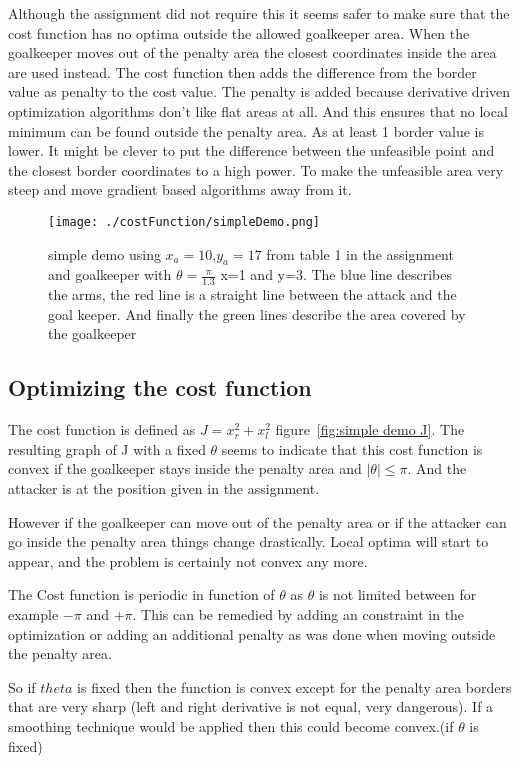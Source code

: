 Although the assignment did not require this it seems safer to make sure that the cost function has no optima outside the allowed goalkeeper area. When the goalkeeper moves out of the penalty area the closest coordinates inside the area are used instead. The cost function then adds the difference from the border value as penalty to the cost value. The penalty is added because derivative driven optimization algorithms don't like flat areas at all. And this ensures that no local minimum can be found outside the penalty area. As at least 1 border value is lower. It might be clever to put the difference between the unfeasible point and the closest border coordinates to a high power. To make the unfeasible area very steep and move gradient based algorithms away from it.


\begin{figure}[H]
	\centering
	\texttt{[image: ./costFunction/simpleDemo.png]}
	\caption{simple demo using $x_a = 10$,$y_a=17$ from table 1 in the assignment and goalkeeper with $\theta=\frac{\pi}{1.3}$ x=1 and y=3. The blue line describes the arms, the red line is a straight line between the attack and the goal keeper. And finally the green lines describe the area covered by the goalkeeper}
	\label{fig:simple demo}
\end{figure}

\subsection{Optimizing the cost function}

The cost function is defined as $J=x_r^2+x_l^2$  figure~\ref{fig:simple demo J}. The resulting graph of J with a fixed $\theta$ seems to indicate that this cost function is convex if the goalkeeper stays inside the penalty area and $|\theta| \leq \pi $. And the attacker is at the position given in the assignment.

However if the goalkeeper can move out of the penalty area or if the attacker can go inside the penalty area things change drastically. Local optima will start to appear, and the problem is certainly not convex any more.

The Cost function is periodic in function of $\theta$ as $\theta$ is not limited between for example $- \pi$ and $+ \pi$. This can be remedied by adding an constraint in the optimization or adding an additional penalty as was done when moving outside the penalty area.

So if $theta$ is fixed then the function is convex except for the penalty area borders that are very sharp (left and right derivative is not equal, very dangerous). If a smoothing technique would be applied then this could become convex.(if $\theta$ is fixed)

